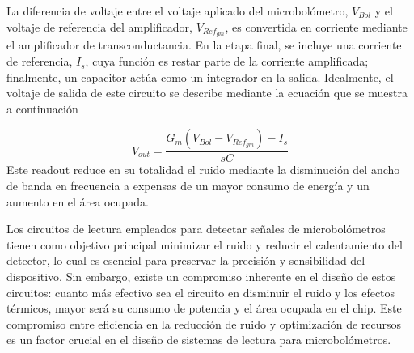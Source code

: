 La diferencia de voltaje entre el voltaje aplicado del microbolómetro, $V_{Bol}$ y el voltaje de referencia del amplificador, $V_{Ref_{gm}}$, es convertida en corriente mediante el amplificador de transconductancia. En la etapa final, se incluye una corriente de referencia, $I_{s}$, cuya función es restar parte de la corriente amplificada; finalmente, un capacitor actúa como un integrador en la salida. Idealmente, el voltaje de salida de este circuito se describe mediante la ecuación que se muestra a continuación

        \begin{equation}
        V_{out} = \frac{G_{m}(V_{Bol}-V_{Ref_{gm}})-I_{s}}{sC}
        \label{eq:ccbdi}
        \end{equation}
Este readout reduce en su totalidad el ruido mediante la disminución del ancho de banda en frecuencia a expensas de un mayor consumo de energía y un aumento en el área ocupada.

\newpage
Los circuitos de lectura empleados para detectar señales de microbolómetros tienen como objetivo principal minimizar el ruido y reducir el calentamiento del detector, lo cual es esencial para preservar la precisión y sensibilidad del dispositivo. Sin embargo, existe un compromiso inherente en el diseño de estos circuitos: cuanto más efectivo sea el circuito en disminuir el ruido y los efectos térmicos, mayor será su consumo de potencia y el área ocupada en el chip. Este compromiso entre eficiencia en la reducción de ruido y optimización de recursos es un factor crucial en el diseño de sistemas de lectura para microbolómetros.          



